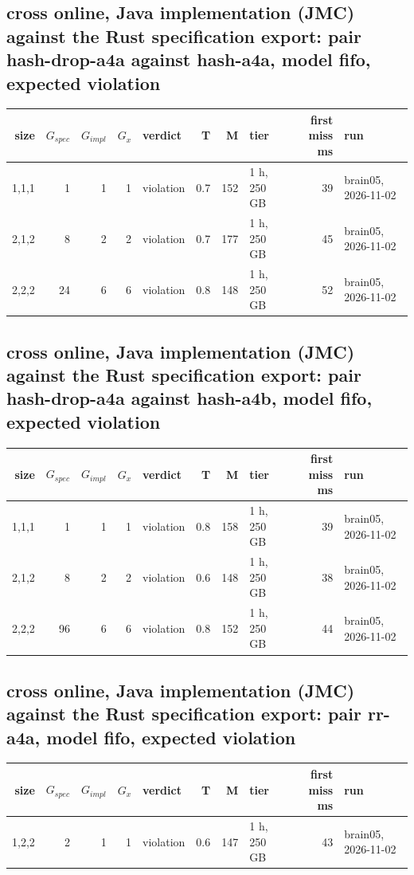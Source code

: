 \documentclass[10pt]{article}
\begin{document}
\subsection*{cross online, Java implementation (JMC) against the Rust specification export: pair \textsf{hash-drop-a4a} against \textsf{hash-a4a}, model fifo, expected violation}
\begin{longtable}{@{}rrrrlrrlrl@{}}
\toprule
size & $G_{\mathit{spec}}$ & $G_{\mathit{impl}}$ & $G_x$ & verdict & T & M & tier & first miss ms & run \\
\midrule
\endhead
\color{red} 1,1,1 & 1 & 1 & 1 & violation & 0.7 & 152 & 1 h, 250 GB & 39 & brain05, 2026-11-02 \\
\color{red} 2,1,2 & 8 & 2 & 2 & violation & 0.7 & 177 & 1 h, 250 GB & 45 & brain05, 2026-11-02 \\
\color{red} 2,2,2 & 24 & 6 & 6 & violation & 0.8 & 148 & 1 h, 250 GB & 52 & brain05, 2026-11-02 \\
\bottomrule
\end{longtable}
\subsection*{cross online, Java implementation (JMC) against the Rust specification export: pair \textsf{hash-drop-a4a} against \textsf{hash-a4b}, model fifo, expected violation}
\begin{longtable}{@{}rrrrlrrlrl@{}}
\toprule
size & $G_{\mathit{spec}}$ & $G_{\mathit{impl}}$ & $G_x$ & verdict & T & M & tier & first miss ms & run \\
\midrule
\endhead
\color{red} 1,1,1 & 1 & 1 & 1 & violation & 0.8 & 158 & 1 h, 250 GB & 39 & brain05, 2026-11-02 \\
\color{red} 2,1,2 & 8 & 2 & 2 & violation & 0.6 & 148 & 1 h, 250 GB & 38 & brain05, 2026-11-02 \\
\color{red} 2,2,2 & 96 & 6 & 6 & violation & 0.8 & 152 & 1 h, 250 GB & 44 & brain05, 2026-11-02 \\
\bottomrule
\end{longtable}
\subsection*{cross online, Java implementation (JMC) against the Rust specification export: pair \textsf{rr-a4a}, model fifo, expected violation}
\begin{longtable}{@{}rrrrlrrlrl@{}}
\toprule
size & $G_{\mathit{spec}}$ & $G_{\mathit{impl}}$ & $G_x$ & verdict & T & M & tier & first miss ms & run \\
\midrule
\endhead
\color{red} 1,2,2 & 2 & 1 & 1 & violation & 0.6 & 147 & 1 h, 250 GB & 43 & brain05, 2026-11-02 \\
\bottomrule
\end{longtable}
\end{document}

